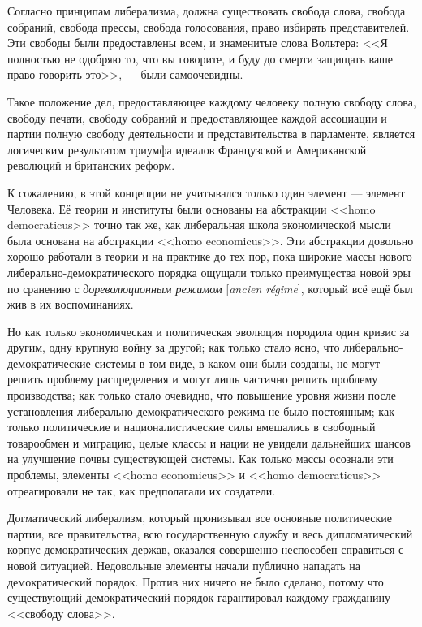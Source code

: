 Согласно принципам либерализма,
должна существовать свобода слова, свобода собраний, свобода прессы, свобода голосования, право избирать представителей. Эти свободы были предоставлены всем, и знаменитые слова Вольтера: <<Я полностью не одобряю то, что вы говорите, и буду до смерти защищать ваше право говорить это>>, — были самоочевидны.

Такое положение дел, предоставляющее каждому человеку полную свободу слова, свободу печати, свободу собраний и предоставляющее каждой ассоциации и партии полную свободу деятельности и представительства в парламенте, является логическим результатом триумфа идеалов Французской и Американской революций и британских реформ.
 
К сожалению, в этой концепции не учитывался только один элемент — элемент Человека. Её теории и институты были основаны на абстракции <<homo democraticus>> точно так же, как либеральная школа экономической мысли была основана на абстракции <<homo economicus>>. Эти абстракции довольно хорошо работали в теории и на практике до тех пор, пока широкие массы нового либерально-демократического порядка ощущали только преимущества новой эры по сранению с \textit{дореволюционным режимом} [\textit{ancien régime}], который всё ещё был жив в их воспоминаниях.

Но как только экономическая и политическая эволюция породила один кризис за другим, одну крупную войну за другой; как только стало ясно, что либерально-демократические системы в том виде, в каком они были созданы, не могут решить проблему распределения и могут лишь частично решить проблему производства; как только стало очевидно, что повышение уровня жизни после установления либерально-демократического режима не было постоянным; как только политические и националистические силы вмешались в свободный товарообмен и миграцию, целые классы и нации не увидели дальнейших шансов на улучшение почвы существующей системы. Как только массы осознали эти проблемы, элементы <<homo economicus>> и <<homo democraticus>> отреагировали не так, как предполагали их создатели.
 
Догматический либерализм, который пронизывал все основные политические партии, все правительства, всю государственную службу и весь дипломатический корпус демократических держав, оказался совершенно неспособен справиться с новой ситуацией. Недовольные элементы начали публично нападать на демократический порядок. Против них ничего не было сделано, потому что существующий демократический порядок гарантировал каждому гражданину <<свободу слова>>.

